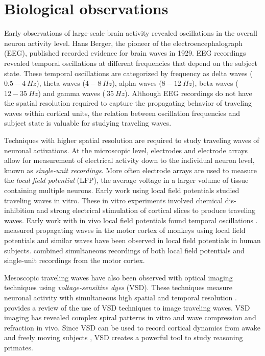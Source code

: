 \section{Biological observations}
Early observations of large-scale brain activity revealed oscillations in the overall neuron activity level.
Hans Berger, the pioneer of the electroencephalograph (EEG), published recorded evidence for brain waves in 1929\citep{Ince2020}.
EEG recordings revealed temporal oscillations at different frequencies that depend on the subject state.
These temporal oscillations are categorized by frequency as delta waves ($0.5-4~Hz$), theta waves ($4-8~Hz$), alpha waves ($8-12~Hz$), 
beta waves ($12-35~Hz$) and gamma waves ($\>35~Hz$).
Although EEG recordings do not have the spatial resolution required to capture the propagating behavior of traveling waves within cortical units, 
the relation between oscillation frequencies and subject state is valuable for studying traveling waves.

Techniques with higher spatial resolution are required to study traveling waves of neuronal activations.
At the microscopic level, electrodes and electrode arrays allow for measurement of electrical activity down to the individual neuron level, known as \textit{single-unit recordings}.
More often electrode arrays are used to measure the \textit{local field potential} (LFP), the average voltage in a larger volume of tissue containing multiple neurons.
Early work using local field potentials studied traveling waves in vitro\citep{Chervin1988}\citep{Golomb1997}.
These in vitro experiments involved chemical dis-inhibition and strong electrical stimulation of cortical slices to produce traveling waves.
Early work with in vivo local field potentials found temporal oscillations \citep{sanes1993}.
\citet{Rubino2006} measured propagating waves in the motor cortex of monkeys using local field potentials 
and similar waves have been observed in local field potentials in human subjects\citep{Takahashi2011}.
\citet{Riehle2013} combined simultaneous recordings of both local field potentials and single-unit recordings from the motor cortex.

Mesoscopic traveling waves have also been observed with optical imaging techniques using \textit{voltage-sensitive dyes} (VSD).
These techniques measure neuronal activity with simultaneous high spatial and temporal resolution \citep{Grinvald2004}\citep{Shoham1999}. 
\citet{wu2008} provides a review of the use of VSD techniques to image traveling waves.
VSD imaging has revealed complex spiral patterns in vitro \citep{huang2004} and wave compression and refraction in vivo\citep{Xu2007}.
Since VSD can be used to record cortical dynamics from awake and freely moving subjects \citep{Muller2014}\citep{Ferezou2006}, 
VSD creates a powerful tool to study reasoning primates.  

